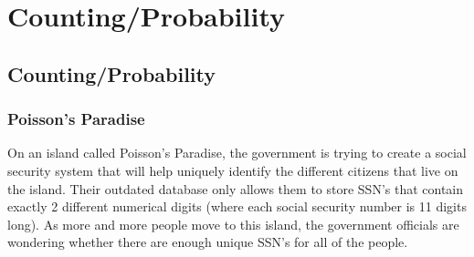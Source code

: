 \documentclass[9pt]{beamer}
\title{\themidterm}
\author{\theauthors}
\institute{\theorganization}
\date{\thedate}
\begin{document}

\begin{frame}[fragile]
  \titlepage
\end{frame}


\section{Counting/Probability}
\subsection{Counting/Probability}

\begin{frame}[fragile]
  \frametitle{Poisson's Paradise} 
{\small
On an island called Poisson's Paradise, the government is trying to create a social security system that will help uniquely identify the different citizens that live on the island. Their outdated database only allows them to store SSN's that contain exactly 2 different numerical digits (where each social security number is 11 digits long). As more and more people move to this island, the government officials are wondering whether there are enough unique SSN's for all of the people. \\ \vspace{5.0mm}
 \\ \vspace{5.0mm}
 \\
}
\end{frame}
\end{document}
